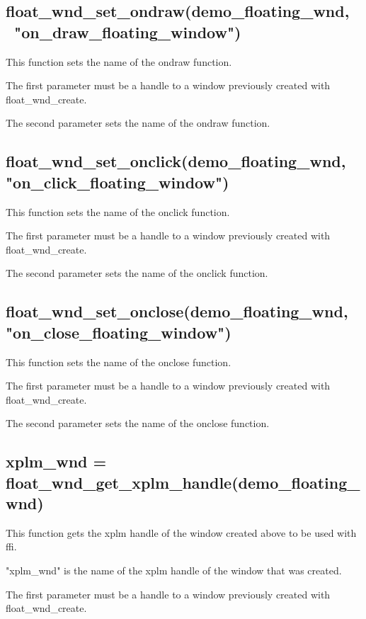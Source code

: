 \documentclass[11pt,parskip=half,a4paper]{scrartcl}
\begin{document}
\subsection{\hspace*{1.0mm}float\_wnd\_set\_ondraw(demo\_floating\_wnd, \ "on\_draw\_floating\_window")}

This function sets the name of the ondraw function.

The first parameter must be a handle to a window previously created with float\_wnd\_create.

The second parameter sets the name of the ondraw function.

\subsection{\hspace*{1.0mm}float\_wnd\_set\_onclick(demo\_floating\_wnd, "on\_click\_floating\_window")}

This function sets the name of the onclick function.

The first parameter must be a handle to a window previously created with float\_wnd\_create.

The second parameter sets the name of the onclick function.

\subsection{\hspace*{1.0mm}float\_wnd\_set\_onclose(demo\_floating\_wnd, "on\_close\_floating\_window")}

This function sets the name of the onclose function.

The first parameter must be a handle to a window previously created with float\_wnd\_create.

The second parameter sets the name of the onclose function.

\subsection{\hspace*{1.0mm}xplm\_wnd = float\_wnd\_get\_xplm\_handle(demo\_floating\_wnd)}

This function gets the xplm handle of the window created above to be used with ffi.

"xplm\_wnd" is the name of the xplm handle of the window that was created.

The first parameter must be a handle to a window previously created with float\_wnd\_create.
\end{document}
